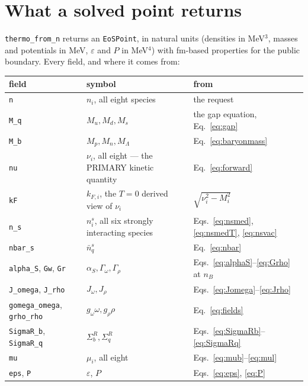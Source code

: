 \documentclass[aps,prc,onecolumn,superscriptaddress,nofootinbib,10pt]{revtex4-2}
\newcommand{\nB}{n_B}
\newcommand{\nbs}{\bar{n}^s}
\newcommand{\SR}{\Sigma^{R}}
\begin{document}
\section{What a solved point returns}
\label{sec:returns}

\texttt{thermo\_from\_n} returns an \texttt{EoSPoint}, in natural units
(densities in MeV$^3$, masses and potentials in MeV, $\varepsilon$ and $P$ in
MeV$^4$) with fm-based properties for the public boundary. Every field, and
where it comes from:

\begin{center}
\begin{tabular}{lll}
\toprule
field & symbol & from \\
\midrule
\texttt{n}          & $n_i$, all eight species & the request \\
\texttt{M\_q}       & $M_u, M_d, M_s$ & the gap equation, Eq.~\eqref{eq:gap} \\
\texttt{M\_b}       & $M_p, M_n, M_\Lambda$ & Eq.~\eqref{eq:baryonmass} \\
\texttt{nu}         & $\nu_i$, all eight --- the PRIMARY kinetic quantity
                    & Eq.~\eqref{eq:forward} \\
\texttt{kF}         & $k_{F,i}$, the $T = 0$ derived view of $\nu_i$
                    & $\sqrt{\nu_i^2 - M_i^2}$ \\
\texttt{n\_s}       & $n^s_i$, all six strongly interacting species
                    & Eqs.~\eqref{eq:nsmed}, \eqref{eq:nsmedT},
                      \eqref{eq:nsvac} \\
\texttt{nbar\_s}    & $\nbs_q$ & Eq.~\eqref{eq:nbar} \\
\texttt{alpha\_S}, \texttt{Gw}, \texttt{Gr}
                    & $\alpha_S, \Gamma_\omega, \Gamma_\rho$
                    & Eqs.~\eqref{eq:alphaS}--\eqref{eq:Grho} at $\nB$ \\
\texttt{J\_omega}, \texttt{J\_rho}
                    & $J_\omega, J_\rho$ & Eqs.~\eqref{eq:Jomega}--\eqref{eq:Jrho} \\
\texttt{gomega\_omega}, \texttt{grho\_rho}
                    & $g_\omega\omega, g_\rho\rho$ & Eq.~\eqref{eq:fields} \\
\texttt{SigmaR\_b}, \texttt{SigmaR\_q}
                    & $\SR_b, \SR_q$ & Eqs.~\eqref{eq:SigmaRb}--\eqref{eq:SigmaRq} \\
\texttt{mu}         & $\mu_i$, all eight & Eqs.~\eqref{eq:mub}--\eqref{eq:mul} \\
\texttt{eps}, \texttt{P} & $\varepsilon$, $P$ & Eqs.~\eqref{eq:eps}, \eqref{eq:P} \\

\end{tabular}
\end{center}
\end{document}
